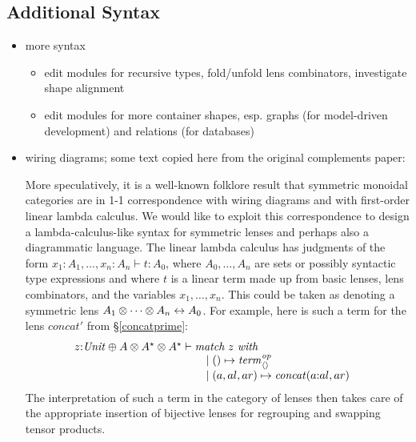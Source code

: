 \subsection{Additional Syntax}
\label{sec:future-syntax}
\begin{itemize}
    \item more syntax
        \begin{itemize}
            \item edit modules for recursive types, fold/unfold lens combinators,
                investigate shape alignment
            \item edit modules for more container shapes, esp. graphs (for
                model-driven development) and relations (for databases)
        \end{itemize}
    \item wiring diagrams; some text copied here from the original
        complements paper:

        More speculatively, it is a well-known folklore result that
        symmetric monoidal categories are in 1-1 correspondence with wiring
        diagrams and with first-order linear lambda calculus. We would like
        to exploit this correspondence to design a lambda-calculus-like
        syntax for symmetric lenses and perhaps also a diagrammatic
        language. The linear lambda calculus has judgments of the form
        $x_1{:}A_1,\dots,x_n{:}A_n\vdash t:A_0$, where $A_0,\dots,A_n$ are
        sets or possibly syntactic type expressions and where $t$ is a
        linear term made up from basic lenses, lens combinators, and the
        variables $x_1,\dots,x_n$. This could be taken as denoting a
        symmetric lens $A_1\otimes\dots\otimes A_n\leftrightarrow A_0$. For example,
        here is such a term for the lens $\mathit{concat}'$ from
        \S\ref{concatprime}:
        \[\begin{array}{@{}l}
        z{:}\Unit \oplus A \otimes A\LIST\otimes A\LIST\vdash
            \begin{array}[t]{@{}l}
            \textit{match}\ z\ \textit{with} \\
            \quad \mid\mlinl\unit \mapsto \const_{\NIL}\op\\
            \quad\mid\mlinr(a,al,ar)\mapsto \mathit{concat}(a\CONS al,ar)
            \end{array}
        \end{array}
        \]
        The interpretation of such a term in the category of lenses then
        takes care of the appropriate insertion of bijective lenses for
        regrouping and swapping tensor products.

\end{itemize}

